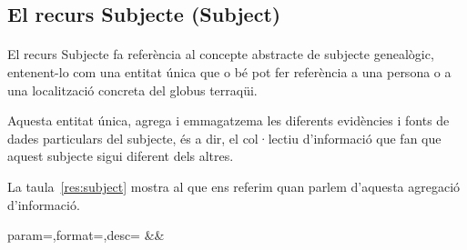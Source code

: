\subsection{El recurs Subjecte (Subject)}

    \paragraph{}
    El recurs Subjecte fa referència al concepte abstracte de subjecte genealògic, entenent-lo com una entitat única que o bé pot fer referència a una persona o a una localització concreta del globus terraqüi.

    Aquesta entitat única, agrega i emmagatzema les diferents evidències i fonts de dades particulars del subjecte, és a dir, el col·lectiu d'informació que fan que aquest subjecte sigui diferent dels altres.

    La taula~\ref{res:subject} mostra al que ens referim quan parlem d'aquesta agregació d'informació.

    \clearpage

    \begin{center}
             {param=\param,format=\format,desc=\desc}
             {\param&\format&\desc}
     \end{center}
